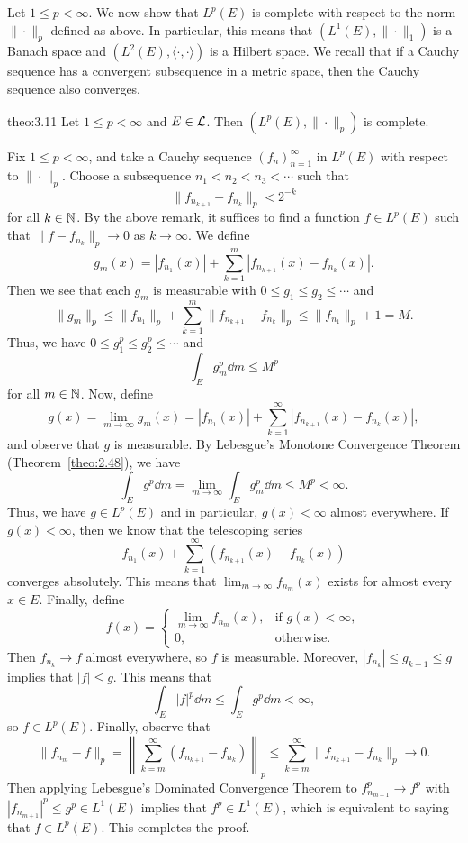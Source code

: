 Let $1 \leq p < \infty$. We now show that $L^p(E)$ is complete with 
respect to the norm $\|\cdot\|_p$ defined as above. In particular, 
this means that $(L^1(E), \|\cdot\|_1)$ is a Banach space and 
$(L^2(E), \langle \cdot, \cdot \rangle)$ is a Hilbert space. 
We recall that if a Cauchy sequence has a convergent subsequence in a 
metric space, then the Cauchy sequence also converges. 

\begin{theo}{theo:3.11}
    Let $1 \leq p < \infty$ and $E \in {\cal L}$. Then $(L^p(E), \|\cdot\|_p)$ 
    is complete. 
\end{theo}
\begin{pf}
    Fix $1 \leq p < \infty$, and take a Cauchy sequence $(f_n)_{n=1}^\infty$ 
    in $L^p(E)$ with respect to $\|\cdot\|_p$. Choose a subsequence 
    $n_1 < n_2 < n_3 < \cdots$ such that 
    \[ \|f_{n_{k+1}} - f_{n_k}\|_p < 2^{-k} \] 
    for all $k \in \mathbb{N}$. By the above remark, it suffices to find a function 
    $f \in L^p(E)$ such that $\|f - f_{n_k}\|_p \to 0$ as $k \to \infty$. 
    We define 
    \[ g_m(x) = |f_{n_1}(x)| + \sum_{k=1}^m |f_{n_{k+1}}(x) - f_{n_k}(x)|. \] 
    Then we see that each $g_m$ is measurable with $0 \leq g_1 
    \leq g_2 \leq \cdots$ and  
    \[ \|g_m\|_p \leq \|f_{n_1}\|_p + \sum_{k=1}^m \|f_{n_{k+1}} - 
    f_{n_k}\|_p \leq \|f_{n_1}\|_p + 1 = M. \]     
    Thus, we have $0 \leq g_1^p \leq g_2^p \leq \cdots$ and 
    \[ \int_E g_m^p \dd m \leq M^p \] 
    for all $m \in \mathbb{N}$. Now, define 
    \[ g(x) = \lim_{m\to\infty} g_m(x) = |f_{n_1}(x)| + 
    \sum_{k=1}^\infty |f_{n_{k+1}}(x) - f_{n_k}(x)|, \] 
    and observe that $g$ is measurable. By Lebesgue's Monotone Convergence 
    Theorem (Theorem~\ref{theo:2.48}), we have 
    \[ \int_E g^p\dd m = \lim_{m\to\infty} \int_E g_m^p\dd m \leq M^p 
    < \infty. \] 
    Thus, we have $g \in L^p(E)$ and in particular, $g(x) < \infty$ almost 
    everywhere. If $g(x) < \infty$, then we know that the telescoping series 
    \[ f_{n_1}(x) + \sum_{k=1}^\infty (f_{n_{k+1}}(x) - f_{n_k}(x)) \] 
    converges absolutely. This means that $\lim_{m\to\infty} f_{n_m}(x)$ 
    exists for almost every $x \in E$. Finally, define 
    \[ f(x) = \begin{cases}
        \lim_{m\to\infty} f_{n_m}(x), & \text{if } g(x) < \infty, \\ 
        0, & \text{otherwise.}
    \end{cases} \] 
    Then $f_{n_k} \to f$ almost everywhere, so $f$ is measurable. Moreover, 
    $|f_{n_k}| \leq g_{k-1} \leq g$ implies that $|f| \leq g$. This means that 
    \[ \int_E |f|^p \dd m \leq \int_E g^p \dd m < \infty, \] 
    so $f \in L^p(E)$. Finally, observe that 
    \[ \|f_{n_m} - f\|_p = \left\| \sum_{k=m}^\infty (f_{n_{k+1}} 
    - f_{n_k}) \right\|_p \leq \sum_{k=m}^\infty \|f_{n_{k+1}} - f_{n_k}\|_p 
    \to 0. \] 
    Then applying Lebesgue's Dominated Convergence Theorem to 
    $f_{n_{m+1}}^p \to f^p$ with $|f_{n_{m+1}}|^p \leq g^p \in L^1(E)$ implies 
    that $f^p \in L^1(E)$, which is equivalent to saying that 
    $f \in L^p(E)$. This completes the proof. 
\end{pf}

